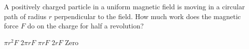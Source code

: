 \begin{questions}\setcounter{question}{21}\question
A positively charged particle in a uniform magnetic field is moving in a circular path of radius $r$ perpendicular to the field. How much work does the magnetic force $F$ do on the charge for half a revolution?

\begin{oneparchoices}
\choice $\pi r^{2} F$
\choice $2 \pi r F$
\choice $\pi r F$
\choice $2 r F$
\choice Zero
\end{oneparchoices}\end{questions}

